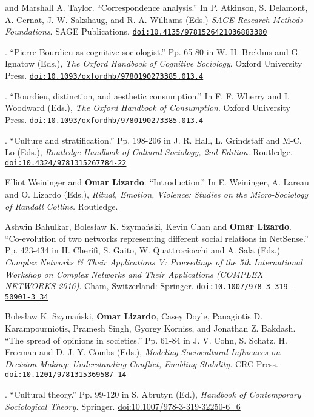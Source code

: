 
 and Marshall A. Taylor. ``Correspondence analysis.'' In P. Atkinson, S. Delamont, A. Cernat, J. W. Sakshaug, and R. A. Williams (Eds.) {\em SAGE Research Methods Foundations}. SAGE Publications. \href{ http://dx.doi.org/10.4135/9781526421036883300 }{\nolinkurl{doi:10.4135/9781526421036883300}}

. ``Pierre Bourdieu as cognitive sociologist.'' Pp. 65-80 in W. H. Brekhus and G. Ignatow (Eds.), {\em The Oxford Handbook of Cognitive Sociology}. Oxford University Press. \href{ http://dx.doi.org/10.1093/oxfordhb/9780190273385.013.4 }{\nolinkurl{doi:10.1093/oxfordhb/9780190273385.013.4}}

. ``Bourdieu, distinction, and aesthetic consumption.'' In F. F. Wherry and I. Woodward (Eds.), {\em The Oxford Handbook of Consumption}. Oxford University Press. \href{ http://dx.doi.org/10.1093/oxfordhb/9780190273385.013.4 }{\nolinkurl{doi:10.1093/oxfordhb/9780190273385.013.4}}

. ``Culture and stratification.'' Pp. 198-206 in J. R. Hall, L. Grindstaff and M-C. Lo (Eds.), {\em Routledge Handbook of Cultural Sociology, 2nd Edition}. Routledge. \href{http://dx.doi.org/10.4324/9781315267784-22 }{\nolinkurl{doi:10.4324/9781315267784-22}}

\ind Elliot Weininger and {\bf Omar Lizardo}. ``Introduction.'' In E. Weininger, A. Lareau and O. Lizardo (Eds.), {\em Ritual, Emotion, Violence: Studies on the Micro-Sociology of Randall Collins.} Routledge. 

\ind Ashwin Bahulkar, Boles\l{}aw K. Szyma\'{n}ski, Kevin Chan and {\bf Omar Lizardo}. ``Co-evolution of two networks representing different social relations in NetSense.'' Pp. 423-434 in H. Cherifi, S. Gaito, W. Quattrociocchi and A. Sala (Eds.)  {\em Complex Networks \& Their Applications V: Proceedings of the 5th International Workshop on Complex Networks and Their Applications (COMPLEX NETWORKS 2016)}. Cham, Switzerland: Springer. \href{https://doi.org/10.1007/978-3-319-50901-3_34}{\nolinkurl{doi:10.1007/978-3-319-50901-3_34}}


\ind Boles\l{}aw K. Szyma\'{n}ski, {\bf Omar Lizardo}, Casey Doyle, Panagiotis D. Karampourniotis, Pramesh Singh, Gyorgy Korniss, and Jonathan Z. Bakdash. ``The spread of opinions in societies.'' Pp. 61-84 in J. V. Cohn, S. Schatz, H. Freeman and D. J. Y. Combs (Eds.), {\em Modeling Sociocultural Influences on Decision Making: Understanding Conflict, Enabling Stability.} CRC Press. \href{http://dx.doi.org/
10.1201/9781315369587-14}{\nolinkurl{doi:10.1201/9781315369587-14}}

. ``Cultural theory.'' Pp. 99-120 in S. Abrutyn (Ed.), {\em Handbook of Contemporary Sociological Theory.} Springer. \newline\href{https://doi.org/10.1007/978-3-319-32250-6_6}{doi:10.1007/978-3-319-32250-6\_6}